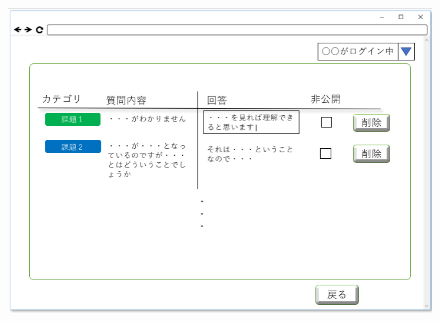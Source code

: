 

\begin{figure}[htbp]
 \begin{minipage}{0.5\hsize}
  \begin{center}
   \includegraphics[width=1\linewidth,clip]{./img/19.png}
  \end{center}


\end{minipage}
\end{figure}
